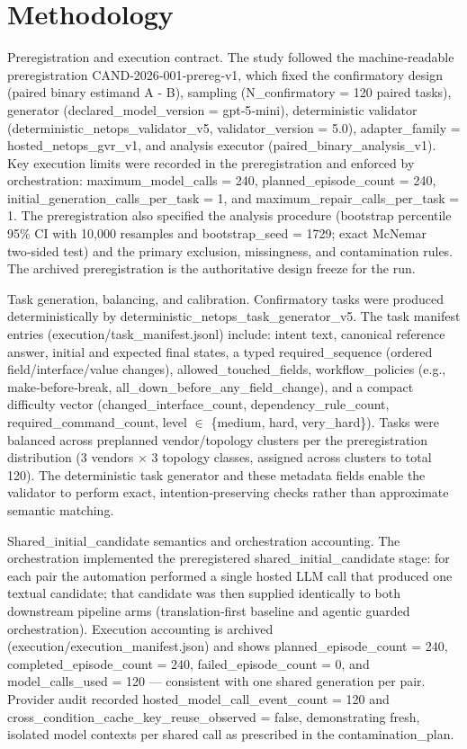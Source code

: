 \documentclass[conference]{IEEEtran}
\begin{document}
\section{Methodology}
Preregistration and execution contract. The study followed the machine‑readable preregistration CAND‑2026‑001‑prereg‑v1, which fixed the confirmatory design (paired binary estimand A - B), sampling (N\_confirmatory = 120 paired tasks), generator (declared\_model\_version = gpt‑5‑mini), deterministic validator (deterministic\_netops\_validator\_v5, validator\_version = 5.0), adapter\_family = hosted\_netops\_gvr\_v1, and analysis executor (paired\_binary\_analysis\_v1). Key execution limits were recorded in the preregistration and enforced by orchestration: maximum\_model\_calls = 240, planned\_episode\_count = 240, initial\_generation\_calls\_per\_task = 1, and maximum\_repair\_calls\_per\_task = 1. The preregistration also specified the analysis procedure (bootstrap percentile 95\% CI with 10,000 resamples and bootstrap\_seed = 1729; exact McNemar two‑sided test) and the primary exclusion, missingness, and contamination rules. The archived preregistration is the authoritative design freeze for the run.

Task generation, balancing, and calibration. Confirmatory tasks were produced deterministically by deterministic\_netops\_task\_generator\_v5. The task manifest entries (execution/task\_manifest.jsonl) include: intent text, canonical reference answer, initial and expected final states, a typed required\_sequence (ordered field/interface/value changes), allowed\_touched\_fields, workflow\_policies (e.g., make‑before‑break, all\_down\_before\_any\_field\_change), and a compact difficulty vector (changed\_interface\_count, dependency\_rule\_count, required\_command\_count, level \ensuremath{\in} \{medium, hard, very\_hard\}). Tasks were balanced across preplanned vendor/topology clusters per the preregistration distribution (3 vendors \ensuremath{\times} 3 topology classes, assigned across clusters to total 120). The deterministic task generator and these metadata fields enable the validator to perform exact, intention‑preserving checks rather than approximate semantic matching.

Shared\_initial\_candidate semantics and orchestration accounting. The orchestration implemented the preregistered shared\_initial\_candidate stage: for each pair the automation performed a single hosted LLM call that produced one textual candidate; that candidate was then supplied identically to both downstream pipeline arms (translation‑first baseline and agentic guarded orchestration). Execution accounting is archived (execution/execution\_manifest.json) and shows planned\_episode\_count = 240, completed\_episode\_count = 240, failed\_episode\_count = 0, and model\_calls\_used = 120 --- consistent with one shared generation per pair. Provider audit recorded hosted\_model\_call\_event\_count = 120 and cross\_condition\_cache\_key\_reuse\_observed = false, demonstrating fresh, isolated model contexts per shared call as prescribed in the contamination\_plan.
\end{document}
